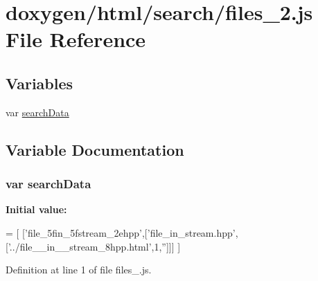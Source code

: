 \hypertarget{a00075}{}\section{doxygen/html/search/files\+\_\+2.js File Reference}
\label{a00075}
\subsection*{Variables}
\begin{DoxyCompactItemize}
\item 
var \hyperlink{a00075_ad01a7523f103d6242ef9b0451861231e}{search\+Data}
\end{DoxyCompactItemize}


\subsection{Variable Documentation}
\hypertarget{a00075_ad01a7523f103d6242ef9b0451861231e}{}
\subsubsection[{search\+Data}]{\setlength{\rightskip}{0pt plus 5cm}var search\+Data}\label{a00075_ad01a7523f103d6242ef9b0451861231e}
{\bfseries Initial value\+:}
\begin{DoxyCode}
=
[
  [\textcolor{stringliteral}{'file\_5fin\_5fstream\_2ehpp'},[\textcolor{stringliteral}{'file\_in\_stream.hpp'},[\textcolor{stringliteral}{'../file\_\_in\_\_stream\_8hpp.html'},1,\textcolor{stringliteral}{''}]]]
]
\end{DoxyCode}


Definition at line 1 of file files\+\_.\+js.

